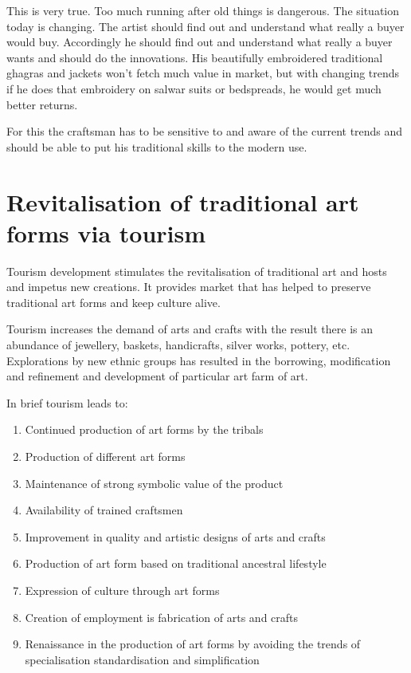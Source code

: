 This is very true. Too much running after old things is dangerous. The situation today is changing. The artist should find out and understand what really a buyer would buy. Accordingly he should find out and understand what really a buyer wants and should do the innovations. His beautifully embroidered traditional ghagras and jackets won't fetch much value in market, but with changing trends if he does that embroidery on salwar suits or bedspreads, he would get much better returns.

For this the craftsman has to be sensitive to and aware of the current trends and should be able to put his traditional skills to the modern use.


\section{Revitalisation of traditional art forms via tourism} %
\label{sec:rev}

Tourism development stimulates the revitalisation of traditional art and hosts and impetus new creations. It provides market that has helped to preserve traditional art forms and keep culture alive.

Tourism increases the demand of arts and crafts with the result there is an abundance of jewellery, baskets, handicrafts, silver works, pottery, etc. Explorations by new ethnic groups has resulted in the borrowing, modification and refinement and development of particular art farm of art.

In brief tourism leads to:

\begin{enumerate}
  \item Continued production of art forms by the tribals
  \item Production of different art forms
  \item Maintenance of strong symbolic value of the product
  \item Availability of trained craftsmen
  \item Improvement in quality and artistic designs of arts and crafts
  \item Production of art form based on traditional ancestral lifestyle
  \item Expression of culture through art forms
  \item Creation of employment is fabrication of arts and crafts
  \item Renaissance in the production of art forms by avoiding the trends of specialisation standardisation and simplification
\end{enumerate}


